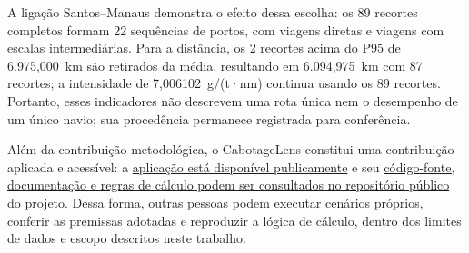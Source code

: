 \documentclass[brazil,]{article}
\begin{document}
A ligação Santos--Manaus demonstra o efeito dessa escolha: os 89
recortes completos formam 22 sequências de portos, com viagens diretas e
viagens com escalas intermediárias. Para a distância, os 2 recortes acima
do P95 de 6.975,000~km são retirados da média, resultando em
6.094,975~km com 87 recortes; a intensidade de 7,006102~g/(t·nm)
continua usando os 89 recortes. Portanto, esses indicadores não
descrevem uma rota única nem o desempenho de um único navio; sua
procedência permanece registrada para conferência.

Além da contribuição metodológica, o CabotageLens constitui uma
contribuição aplicada e acessível: a
\href{https://cabotagelens.streamlit.app/}{aplicação está disponível
publicamente} e seu
\href{https://github.com/pennylanesccp/cabotage-lens}{código-fonte,
documentação e regras de cálculo podem ser consultados no repositório
público do projeto}. Dessa forma, outras pessoas podem executar cenários
próprios, conferir as premissas adotadas e reproduzir a lógica de cálculo,
dentro dos limites de dados e escopo descritos neste trabalho.

\clearpage
\begingroup
\small
\printbibliography[heading=bibintoc,title={Referências}]
\endgroup
\end{document}
